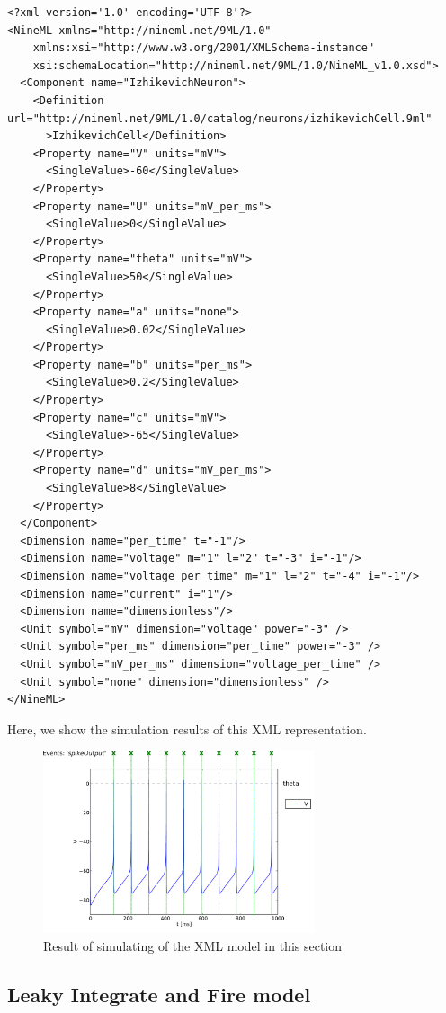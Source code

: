 \documentclass[draftspec]{ninemlspec}
\begin{document}
\begin{lstlisting}[style=XML]
<?xml version='1.0' encoding='UTF-8'?>
<NineML xmlns="http://nineml.net/9ML/1.0"
    xmlns:xsi="http://www.w3.org/2001/XMLSchema-instance"
    xsi:schemaLocation="http://nineml.net/9ML/1.0/NineML_v1.0.xsd">
  <Component name="IzhikevichNeuron">
    <Definition url="http://nineml.net/9ML/1.0/catalog/neurons/izhikevichCell.9ml"
      >IzhikevichCell</Definition>
    <Property name="V" units="mV">
      <SingleValue>-60</SingleValue>
    </Property>
    <Property name="U" units="mV_per_ms">
      <SingleValue>0</SingleValue>
    </Property>
    <Property name="theta" units="mV">
      <SingleValue>50</SingleValue>
    </Property>
    <Property name="a" units="none">
      <SingleValue>0.02</SingleValue>
    </Property>
    <Property name="b" units="per_ms">
      <SingleValue>0.2</SingleValue>
    </Property>
    <Property name="c" units="mV">
      <SingleValue>-65</SingleValue>
    </Property>
    <Property name="d" units="mV_per_ms">
      <SingleValue>8</SingleValue>
    </Property>
  </Component>
  <Dimension name="per_time" t="-1"/>
  <Dimension name="voltage" m="1" l="2" t="-3" i="-1"/>
  <Dimension name="voltage_per_time" m="1" l="2" t="-4" i="-1"/>
  <Dimension name="current" i="1"/>
  <Dimension name="dimensionless"/>
  <Unit symbol="mV" dimension="voltage" power="-3" />
  <Unit symbol="per_ms" dimension="per_time" power="-3" />
  <Unit symbol="mV_per_ms" dimension="voltage_per_time" />
  <Unit symbol="none" dimension="dimensionless" />
</NineML>
\end{lstlisting}

Here, we show the simulation results of this XML representation.
\begin{figure}[htb!]
\center
\includegraphics[width=8cm]{figures/example_IzVoltageWave.pdf}
\protect\caption{Result of simulating of the XML model in
this section}
\label{fig:Ex1_Output}
\end{figure}

\subsection{Leaky Integrate and Fire model}
\end{document}
